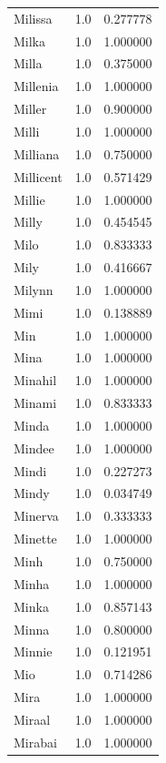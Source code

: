 \documentclass[
  letterpaper,
  DIV=11,
  numbers=noendperiod]{scrreprt}
\begin{document}
\begin{tabular}{lrr}
Milissa         &   1.0 &   0.277778 \\
Milka           &   1.0 &   1.000000 \\
Milla           &   1.0 &   0.375000 \\
Millenia        &   1.0 &   1.000000 \\
Miller          &   1.0 &   0.900000 \\
Milli           &   1.0 &   1.000000 \\
Milliana        &   1.0 &   0.750000 \\
Millicent       &   1.0 &   0.571429 \\
Millie          &   1.0 &   1.000000 \\
Milly           &   1.0 &   0.454545 \\
Milo            &   1.0 &   0.833333 \\
Mily            &   1.0 &   0.416667 \\
Milynn          &   1.0 &   1.000000 \\
Mimi            &   1.0 &   0.138889 \\
Min             &   1.0 &   1.000000 \\
Mina            &   1.0 &   1.000000 \\
Minahil         &   1.0 &   1.000000 \\
Minami          &   1.0 &   0.833333 \\
Minda           &   1.0 &   1.000000 \\
Mindee          &   1.0 &   1.000000 \\
Mindi           &   1.0 &   0.227273 \\
Mindy           &   1.0 &   0.034749 \\
Minerva         &   1.0 &   0.333333 \\
Minette         &   1.0 &   1.000000 \\
Minh            &   1.0 &   0.750000 \\
Minha           &   1.0 &   1.000000 \\
Minka           &   1.0 &   0.857143 \\
Minna           &   1.0 &   0.800000 \\
Minnie          &   1.0 &   0.121951 \\
Mio             &   1.0 &   0.714286 \\
Mira            &   1.0 &   1.000000 \\
Miraal          &   1.0 &   1.000000 \\
Mirabai         &   1.0 &   1.000000 \\

\end{tabular}
\end{document}
